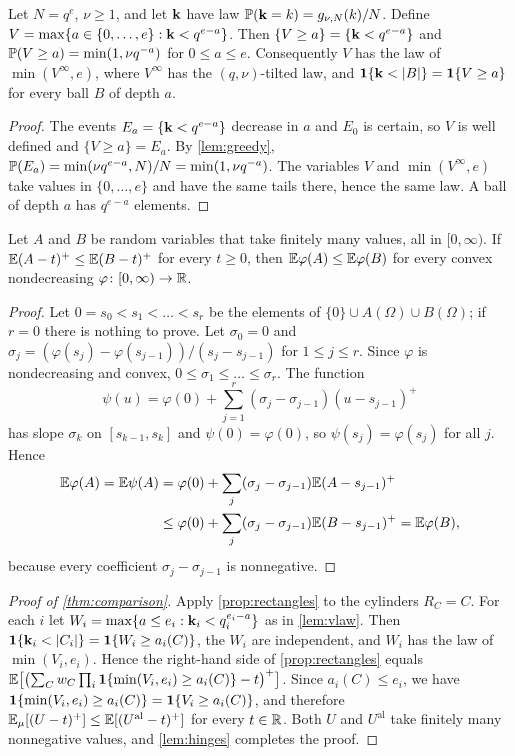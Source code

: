 \begin{lemma}\label{lem:vlaw}
Let $N=q^e$, $\nu\ge1$, and let $\bk$ have law $\P(\bk=k)=g_{\nu,N}(k)/N$. Define
$V=\max\{a\in\{0,\dots,e\}:\bk<q^{e-a}\}$. Then $\{V\ge a\}=\{\bk<q^{e-a}\}$ and
$\P(V\ge a)=\min(1,\nu q^{-a})$ for $0\le a\le e$. Consequently $V$ has the law of $\min(V^\infty,e)$, where
$V^\infty$ has the $(q,\nu)$-tilted law, and $\one\{\bk<|B|\}=\one\{V\ge a\}$ for every ball $B$ of depth $a$.
\end{lemma}

\begin{proof}
The events $E_a=\{\bk<q^{e-a}\}$ decrease in $a$ and $E_0$ is certain, so $V$ is well defined and
$\{V\ge a\}=E_a$. By \cref{lem:greedy}, $\P(E_a)=\min(\nu q^{e-a},N)/N=\min(1,\nu q^{-a})$. The variables $V$ and
$\min(V^\infty,e)$ take values in $\{0,\dots,e\}$ and have the same tails there, hence the same law. A ball of
depth $a$ has $q^{e-a}$ elements.
\end{proof}

\begin{lemma}\label{lem:hinges}
Let $A$ and $B$ be random variables that take finitely many values, all in $[0,\infty)$. If
$\E(A-t)^+\le\E(B-t)^+$ for every $t\ge0$, then $\E\varphi(A)\le\E\varphi(B)$ for every convex nondecreasing
$\varphi\colon[0,\infty)\to\R$.
\end{lemma}

\begin{proof}
Let $0=s_0<s_1<\dots<s_r$ be the elements of $\{0\}\cup A(\Omega)\cup B(\Omega)$; if $r=0$ there is nothing to prove.
Let $\sigma_0=0$ and $\sigma_j=(\varphi(s_j)-\varphi(s_{j-1}))/(s_j-s_{j-1})$ for $1\le j\le r$. Since $\varphi$ is
nondecreasing and convex, $0\le\sigma_1\le\dots\le\sigma_r$. The function
\[
  \psi(u)=\varphi(0)+\sum_{j=1}^r(\sigma_j-\sigma_{j-1})(u-s_{j-1})^+
\]
has slope $\sigma_k$ on $[s_{k-1},s_k]$ and $\psi(0)=\varphi(0)$, so $\psi(s_j)=\varphi(s_j)$ for all $j$. Hence
\begin{align*}
  \E\varphi(A)=\E\psi(A)&=\varphi(0)+\sum_j(\sigma_j-\sigma_{j-1})\E(A-s_{j-1})^+\\
  &\le\varphi(0)+\sum_j(\sigma_j-\sigma_{j-1})\E(B-s_{j-1})^+=\E\varphi(B),
\end{align*}
because every coefficient $\sigma_j-\sigma_{j-1}$ is nonnegative.
\end{proof}

\begin{proof}[Proof of \cref{thm:comparison}]
Apply \cref{prop:rectangles} to the cylinders $R_C=C$. For each $i$ let $W_i=\max\{a\le e_i:\bk_i<q_i^{e_i-a}\}$ as in
\cref{lem:vlaw}. Then $\one\{\bk_i<|C_i|\}=\one\{W_i\ge a_i(C)\}$, the $W_i$ are independent, and $W_i$ has the law
of $\min(V_i,e_i)$. Hence the right-hand side of \cref{prop:rectangles} equals
$\E\bigl[\bigl(\sum_Cw_C\prod_i\one\{\min(V_i,e_i)\ge a_i(C)\}-t\bigr)^+\bigr]$. Since $a_i(C)\le e_i$, we have
$\one\{\min(V_i,e_i)\ge a_i(C)\}=\one\{V_i\ge a_i(C)\}$, and therefore $\E_\mu[(U-t)^+]\le\E[(U^{\mathrm{al}}-t)^+]$ for
every $t\in\R$. Both $U$ and $U^{\mathrm{al}}$ take finitely many nonnegative values, and \cref{lem:hinges} completes
the proof.
\end{proof}

